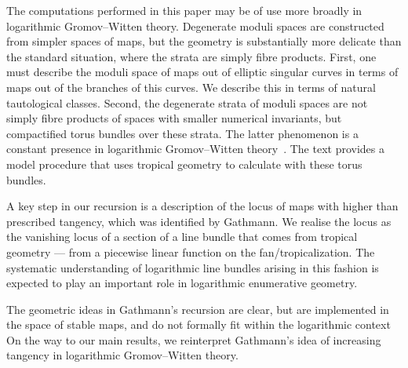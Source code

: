 \documentclass[11pt]{amsart}
\theoremstyle{definition}
\theoremstyle{definition}
\begin{document}
The computations performed in this paper may be of use more broadly in logarithmic Gromov--Witten theory. Degenerate moduli spaces are constructed from simpler spaces of maps, but the geometry is substantially more delicate than the standard situation, where the strata are simply fibre products. First, one must describe the moduli space of maps out of elliptic singular curves in terms of maps out of the branches of this curves. We describe this in terms of natural tautological classes. Second, the degenerate strata of moduli spaces are not simply fibre products of spaces with smaller numerical invariants, but compactified torus bundles over these strata. The latter phenomenon is a constant presence in logarithmic Gromov--Witten theory~\cite{AW,R19}. The text provides a model procedure that uses tropical geometry to calculate with these torus bundles. 

A key step in our recursion is a description of the locus of maps with higher than prescribed tangency, which was identified by Gathmann. We realise the locus as the vanishing locus of a section of a line bundle that comes from tropical geometry — from a piecewise linear function on the fan/tropicalization. The systematic understanding of logarithmic line bundles arising in this fashion is expected to play an important role in logarithmic enumerative geometry. 

The geometric ideas in Gathmann's recursion are clear, but are implemented in the space of stable maps, and do not formally fit within the logarithmic context On the way to our main results, we reinterpret Gathmann's idea of increasing tangency in logarithmic Gromov--Witten theory. %

\end{document}
